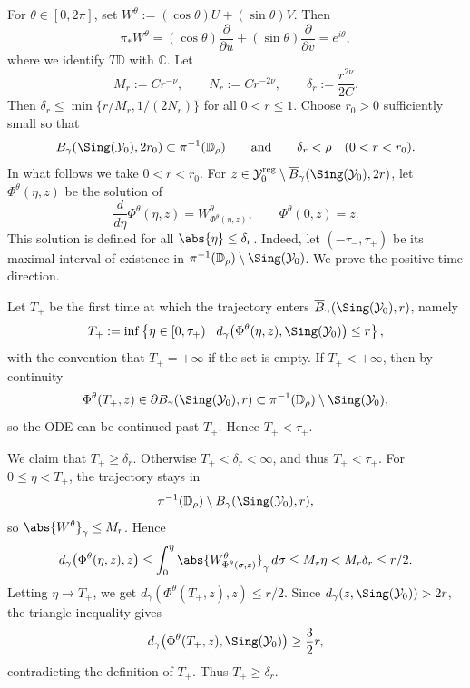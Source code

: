 \documentclass[12pt]{amsart}
\begin{document}
For \(\theta\in[0,2\pi]\), set \(W^{\theta}:=(\cos\theta)U+(\sin\theta)V\). Then
\[
\pi_{*}W^{\theta}
=
(\cos\theta)\frac{\partial}{\partial u}
+
(\sin\theta)\frac{\partial}{\partial v}
=
e^{i\theta},
\]
where we identify \(T\mathbb{D}\) with \(\mathbb{C}\). Let
\[
M_{r}:=Cr^{-\nu},
\qquad
N_{r}:=Cr^{-2\nu},
\qquad
\delta_{r}:=\frac{r^{2\nu}}{2C}.
\]
Then
\(\delta_{r}\leq \min\{r/M_{r},1/(2N_{r})\}\) for all \(0<r\leq 1\).
Choose \(r_{0}>0\) sufficiently small so that
\[
B_{\gamma}(\Sing(\mathcal{Y}_{0}),2r_{0})\subset \pi^{-1}(\mathbb{D}_{\rho})
\qquad\text{and}\qquad
\delta_{r}<\rho
\quad
(0<r<r_{0}).
\]
In what follows we take \(0<r<r_{0}\). For
\(z\in\mathcal{Y}_{0}^{\mathrm{reg}}\setminus
\overline{B}_{\gamma}(\Sing(\mathcal{Y}_{0}),2r)\), let \(\Phi^{\theta}(\eta,z)\) be the solution of
\begin{equation}
\label{eqn:flow-equation}
\frac{d}{d\eta}\Phi^{\theta}(\eta,z)
=
W^{\theta}_{\Phi^{\theta}(\eta,z)},
\qquad
\Phi^{\theta}(0,z)=z .
\end{equation}
This solution is defined for all \(\abs{\eta}\leq\delta_{r}\). Indeed, let
\((-\tau_{-},\tau_{+})\) be its maximal interval of existence in
\(\pi^{-1}(\mathbb{D}_{\rho})\setminus\Sing(\mathcal{Y}_{0})\). We prove the positive-time direction.

Let \(T_{+}\) be the first time at which the trajectory enters
\(\overline{B}_{\gamma}(\Sing(\mathcal{Y}_{0}),r)\), namely
\[
T_{+}:=\inf\left\{
\eta\in[0,\tau_{+}) \mid
d_{\gamma}\bigl(\Phi^{\theta}(\eta,z),\Sing(\mathcal{Y}_{0})\bigr)\leq r
\right\},
\]
with the convention that \(T_{+}=+\infty\) if the set is empty. If \(T_{+}<+\infty\), then by continuity
\[
\Phi^{\theta}(T_{+},z)\in \partial B_{\gamma}(\Sing(\mathcal{Y}_{0}),r)
\subset \pi^{-1}(\mathbb{D}_{\rho})\setminus\Sing(\mathcal{Y}_{0}),
\]
so the ODE can be continued past \(T_{+}\). Hence \(T_{+}<\tau_{+}\).

We claim that \(T_{+}\geq\delta_{r}\). Otherwise \(T_{+}<\delta_{r}< \infty\), and thus
\(T_{+}<\tau_{+}\). For \(0\leq\eta<T_{+}\), the trajectory stays in
\[
\pi^{-1}(\mathbb{D}_{\rho})
\setminus
B_{\gamma}(\Sing(\mathcal{Y}_{0}),r),
\]
so \(\abs{W^{\theta}}_{\gamma}\leq M_{r}\). Hence
\[
d_{\gamma}\bigl(\Phi^{\theta}(\eta,z),z\bigr)
\leq
\int_{0}^{\eta}
\abs{W^{\theta}_{\Phi^{\theta}(\sigma,z)}}_{\gamma}\,d\sigma
\leq
M_{r}\eta
<
M_{r}\delta_{r}
\leq
r/2 .
\]
Letting \(\eta\to T_{+}\), we get
\(d_{\gamma}(\Phi^{\theta}(T_{+},z),z)\leq r/2\). Since
\(d_{\gamma}(z,\Sing(\mathcal{Y}_{0})) > 2r\), the triangle inequality gives
\[
d_{\gamma}\bigl(\Phi^{\theta}(T_{+},z),\Sing(\mathcal{Y}_{0})\bigr)
\geq \frac{3}{2}r,
\]
contradicting the definition of \(T_{+}\). Thus \(T_{+}\geq\delta_{r}\).
\end{document}
